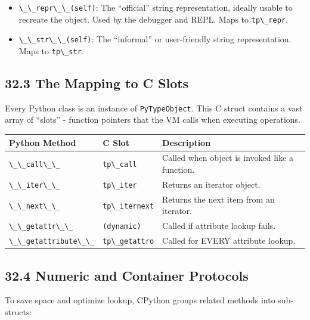 \begin{itemize}
\tightlist
\item
  \passthrough{\lstinline!\_\_repr\_\_(self)!}: The ``official'' string
  representation, ideally usable to recreate the object. Used by the
  debugger and REPL. Maps to \passthrough{\lstinline!tp\_repr!}.
\item
  \passthrough{\lstinline!\_\_str\_\_(self)!}: The ``informal'' or
  user-friendly string representation. Maps to
  \passthrough{\lstinline!tp\_str!}.
\end{itemize}

\hypertarget{the-mapping-to-c-slots}{%
\subsection{32.3 The Mapping to C Slots}\label{the-mapping-to-c-slots}}

Every Python class is an instance of
\passthrough{\lstinline!PyTypeObject!}. This C struct contains a vast
array of ``slots'' - function pointers that the VM calls when executing
operations.

\begin{longtable}[]{@{}lll@{}}
\toprule
Python Method & C Slot & Description \\
\midrule
\endhead
\passthrough{\lstinline!\_\_call\_\_!} &
\passthrough{\lstinline!tp\_call!} & Called when object is invoked like
a function. \\
\passthrough{\lstinline!\_\_iter\_\_!} &
\passthrough{\lstinline!tp\_iter!} & Returns an iterator object. \\
\passthrough{\lstinline!\_\_next\_\_!} &
\passthrough{\lstinline!tp\_iternext!} & Returns the next item from an
iterator. \\
\passthrough{\lstinline!\_\_getattr\_\_!} &
\passthrough{\lstinline!(dynamic)!} & Called if attribute lookup
fails. \\
\passthrough{\lstinline!\_\_getattribute\_\_!} &
\passthrough{\lstinline!tp\_getattro!} & Called for EVERY attribute
lookup. \\
\bottomrule
\end{longtable}

\hypertarget{numeric-and-container-protocols}{%
\subsection{32.4 Numeric and Container
Protocols}\label{numeric-and-container-protocols}}

To save space and optimize lookup, CPython groups related methods into
sub-structs:

